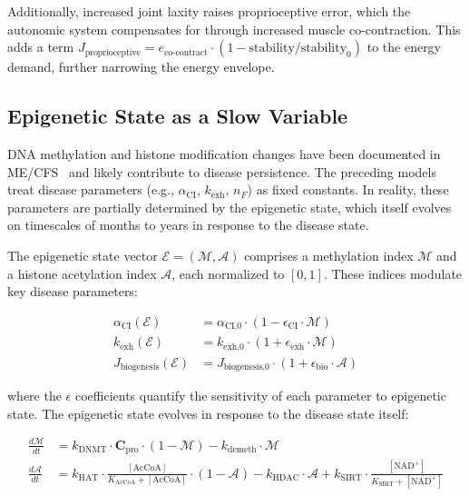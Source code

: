 Additionally, increased joint laxity raises proprioceptive error, which the autonomic system compensates for through increased muscle co-contraction. This adds a term $J_{\text{proprioceptive}} = e_{\text{co-contract}} \cdot (1 - \text{stability}/\text{stability}_0)$ to the energy demand, further narrowing the energy envelope.

\subsection{Epigenetic State as a Slow Variable}
\label{sec:epigenetic-dynamics}

DNA methylation and histone modification changes have been documented in ME/CFS~\cite{deVega2021dna_methylation} and likely contribute to disease persistence. The preceding models treat disease parameters (e.g., $\alpha_{\text{CI}}$, $k_{\text{exh}}$, $n_F$) as fixed constants. In reality, these parameters are partially determined by the epigenetic state, which itself evolves on timescales of months to years in response to the disease state.

The epigenetic state vector $\boldsymbol{\mathcal{E}} = (\mathcal{M}, \mathcal{A})$ comprises a methylation index $\mathcal{M}$ and a histone acetylation index $\mathcal{A}$, each normalized to $[0, 1]$. These indices modulate key disease parameters:

\begin{align}
\label{eq:epigenetic-modulation}
\alpha_{\text{CI}}(\mathcal{E}) &= \alpha_{\text{CI,0}} \cdot (1 - \epsilon_{\text{CI}} \cdot \mathcal{M}) \\
k_{\text{exh}}(\mathcal{E}) &= k_{\text{exh,0}} \cdot (1 + \epsilon_{\text{exh}} \cdot \mathcal{M}) \\
J_{\text{biogenesis}}(\mathcal{E}) &= J_{\text{biogenesis,0}} \cdot (1 + \epsilon_{\text{bio}} \cdot \mathcal{A})
\end{align}

where the $\epsilon$ coefficients quantify the sensitivity of each parameter to epigenetic state. The epigenetic state evolves in response to the disease state itself:

\begin{align}
\label{eq:epigenetic-evolution}
\frac{d\mathcal{M}}{dt} &= k_{\text{DNMT}} \cdot \boldsymbol{C}_{\text{pro}} \cdot (1 - \mathcal{M}) - k_{\text{demeth}} \cdot \mathcal{M} \\
\frac{d\mathcal{A}}{dt} &= k_{\text{HAT}} \cdot \frac{[\text{AcCoA}]}{K_{\text{AcCoA}} + [\text{AcCoA}]} \cdot (1 - \mathcal{A}) - k_{\text{HDAC}} \cdot \mathcal{A} + k_{\text{SIRT}} \cdot \frac{[\text{NAD}^+]}{K_{\text{SIRT}} + [\text{NAD}^+]}
\end{align}

